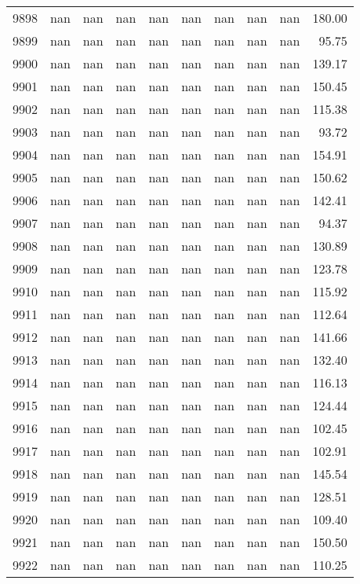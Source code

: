 \begin{tabular}{lrrrrrrrrr}
9898 & nan & nan & nan & nan & nan & nan & nan & nan & 180.00 \\
9899 & nan & nan & nan & nan & nan & nan & nan & nan & 95.75 \\
9900 & nan & nan & nan & nan & nan & nan & nan & nan & 139.17 \\
9901 & nan & nan & nan & nan & nan & nan & nan & nan & 150.45 \\
9902 & nan & nan & nan & nan & nan & nan & nan & nan & 115.38 \\
9903 & nan & nan & nan & nan & nan & nan & nan & nan & 93.72 \\
9904 & nan & nan & nan & nan & nan & nan & nan & nan & 154.91 \\
9905 & nan & nan & nan & nan & nan & nan & nan & nan & 150.62 \\
9906 & nan & nan & nan & nan & nan & nan & nan & nan & 142.41 \\
9907 & nan & nan & nan & nan & nan & nan & nan & nan & 94.37 \\
9908 & nan & nan & nan & nan & nan & nan & nan & nan & 130.89 \\
9909 & nan & nan & nan & nan & nan & nan & nan & nan & 123.78 \\
9910 & nan & nan & nan & nan & nan & nan & nan & nan & 115.92 \\
9911 & nan & nan & nan & nan & nan & nan & nan & nan & 112.64 \\
9912 & nan & nan & nan & nan & nan & nan & nan & nan & 141.66 \\
9913 & nan & nan & nan & nan & nan & nan & nan & nan & 132.40 \\
9914 & nan & nan & nan & nan & nan & nan & nan & nan & 116.13 \\
9915 & nan & nan & nan & nan & nan & nan & nan & nan & 124.44 \\
9916 & nan & nan & nan & nan & nan & nan & nan & nan & 102.45 \\
9917 & nan & nan & nan & nan & nan & nan & nan & nan & 102.91 \\
9918 & nan & nan & nan & nan & nan & nan & nan & nan & 145.54 \\
9919 & nan & nan & nan & nan & nan & nan & nan & nan & 128.51 \\
9920 & nan & nan & nan & nan & nan & nan & nan & nan & 109.40 \\
9921 & nan & nan & nan & nan & nan & nan & nan & nan & 150.50 \\
9922 & nan & nan & nan & nan & nan & nan & nan & nan & 110.25 \\

\end{tabular}
